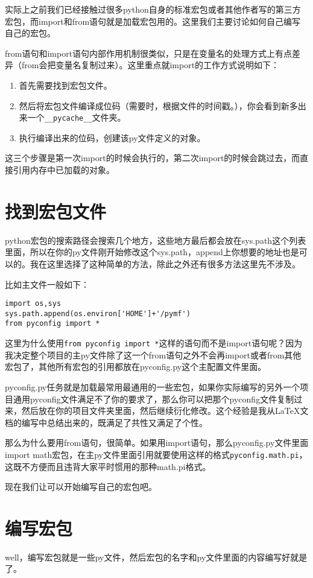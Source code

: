 \documentclass[12pt,oneside]{book}
\begin{document}
\begin{common-format}
实际上之前我们已经接触过很多python自身的标准宏包或者其他作者写的第三方宏包，而import和from语句就是加载宏包用的。这里我们主要讨论如何自己编写自己的宏包。

from语句和import语句内部作用机制很类似，只是在变量名的处理方式上有点差异（from会把变量名复制过来）。这里重点就import的工作方式说明如下：
\begin{enumerate}
\item 首先需要找到宏包文件。
\item 然后将宏包文件编译成位码（需要时，根据文件的时间戳。），你会看到新多出来一个\verb+__pycache__+文件夹。
\item 执行编译出来的位码，创建该py文件定义的对象。
\end{enumerate}
这三个步骤是第一次import的时候会执行的，第二次import的时候会跳过去，而直接引用内存中已加载的对象。



\section{找到宏包文件}
python宏包的搜索路径会搜索几个地方，这些地方最后都会放在sys.path这个列表里面，所以在你的py文件刚开始修改这个sys.path，append上你想要的地址也是可以的。我在这里选择了这种简单的方法，除此之外还有很多方法这里先不涉及。

比如主文件一般如下：
\begin{Verbatim}
import os,sys
sys.path.append(os.environ['HOME']+'/pymf')
from pyconfig import *
\end{Verbatim}
这里为什么使用\verb+from pyconfig import *+这样的语句而不是import语句呢？因为我决定整个项目的主py文件除了这一个from语句之外不会再import或者from其他宏包了，其他所有宏包的引用都放在pyconfig.py这个主配置文件里面。

pyconfig.py任务就是加载最常用最通用的一些宏包，如果你实际编写的另外一个项目通用pyconfig文件满足不了你的要求了，那么你可以把那个pyconfig文件复制过来，然后放在你的项目文件夹里面，然后继续衍化修改。这个经验是我从\LaTeX 文档的编写中总结出来的，既满足了共性又满足了个性。

那么为什么要用from语句，很简单。如果用import语句，那么pyconfig.py文件里面import math宏包，在主py文件里面引用就要使用这样的格式\verb+pyconfig.math.pi+，这既不方便而且违背大家平时惯用的那种math.pi格式。


现在我们让可以开始编写自己的宏包吧。

\section{编写宏包}
well，编写宏包就是一些py文件，然后宏包的名字和py文件里面的内容编写好就是了。


\end{common-format}
\end{document}
